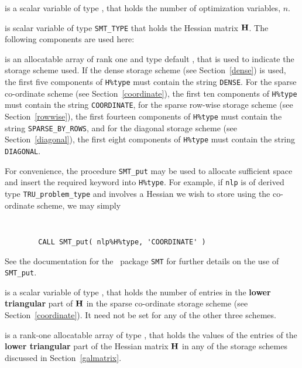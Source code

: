 \documentclass{galahad}
\newcommand{\packagename}{TRU}
\begin{document}
\begin{description}

 is a scalar variable of type \integer,
 that holds the number of optimization variables, $n$.

 is scalar variable of type {\tt SMT\_TYPE}
that holds the Hessian matrix ${\mathbf{H}}$. The following components
are used here:

\begin{description}

 is an allocatable array of rank one and type default
\character, that
is used to indicate the storage scheme used. If the dense storage scheme
(see Section~\ref{dense}) is used,
the first five components of {\tt H\%type} must contain the
string {\tt DENSE}.
For the sparse co-ordinate scheme (see Section~\ref{coordinate}),
the first ten components of {\tt H\%type} must contain the
string {\tt COORDINATE},
for the sparse row-wise storage scheme (see Section~\ref{rowwise}),
the first fourteen components of {\tt H\%type} must contain the
string {\tt SPARSE\_BY\_ROWS},
and for the diagonal storage scheme (see Section~\ref{diagonal}),
the first eight components of {\tt H\%type} must contain the
string {\tt DIAGONAL}.

For convenience, the procedure {\tt SMT\_put}
may be used to allocate sufficient space and insert the required keyword
into {\tt H\%type}.
For example, if {\tt nlp} is of derived type {\tt \packagename\_problem\_type}
and involves a Hessian we wish to store using the co-ordinate scheme,
we may simply
{\tt
\begin{verbatim}
        CALL SMT_put( nlp%H%type, 'COORDINATE' )
\end{verbatim}
}
\noindent
See the documentation for the \galahad\ package {\tt SMT}
for further details on the use of {\tt SMT\_put}.

 is a scalar variable of type \integer, that
holds the number of entries in the {\bf lower triangular} part of ${\mathbf{H}}$
in the sparse co-ordinate storage scheme (see Section~\ref{coordinate}).
It need not be set for any of the other three schemes.

 is a rank-one allocatable array of type \realdp, that holds
the values of the entries of the {\bf lower triangular} part
of the Hessian matrix ${\mathbf{H}}$ in any of the
storage schemes discussed in Section~\ref{galmatrix}.


\end{description}
\end{description}
\end{document}
